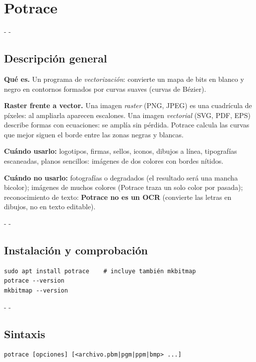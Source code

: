 \documentclass[11pt,a4paper]{article}
\makeatletter
\newcommand{\necesitaespacio}[1]{\par\penalty-100\begingroup
	\setlength{\dimen@}{#1}\dimen@ii\pagegoal\advance\dimen@ii-\pagetotal
	\ifdim\dimen@>\dimen@ii\ifdim\dimen@ii>\z@\vfil\fi\penalty-\@M\fi\endgroup}
\makeatother
\begin{document}
	\section{Potrace}\label{sec:potrace}
	
	\necesitaespacio{8\baselineskip}
	\subsection{Descripción general}
	
	\textbf{Qué es.} Un programa de \emph{vectorización}: convierte un mapa de bits en blanco y negro en contornos formados por curvas suaves (curvas de Bézier).
	
	\textbf{Raster frente a vector.} Una imagen \emph{raster} (PNG, JPEG) es una cuadrícula de píxeles: al ampliarla aparecen escalones. Una imagen \emph{vectorial} (SVG, PDF, EPS) describe formas con ecuaciones: se amplía sin pérdida. Potrace calcula las curvas que mejor siguen el borde entre las zonas negras y blancas.
	
	\textbf{Cuándo usarlo:} logotipos, firmas, sellos, iconos, dibujos a línea, tipografías escaneadas, planos sencillos: imágenes de dos colores con bordes nítidos.
	
	\textbf{Cuándo no usarlo:} fotografías o degradados (el resultado será una mancha bicolor); imágenes de muchos colores (Potrace traza un solo color por pasada); reconocimiento de texto: \textbf{Potrace no es un OCR} (convierte las letras en dibujos, no en texto editable).
	
	\necesitaespacio{8\baselineskip}
	\subsection{Instalación y comprobación}
	
	\begin{lstlisting}
sudo apt install potrace    # incluye también mkbitmap
potrace --version
mkbitmap --version
\end{lstlisting}
	
	\necesitaespacio{8\baselineskip}
	\subsection{Sintaxis}
	
	\begin{lstlisting}[style=sintaxis]
potrace [opciones] [<archivo.pbm|pgm|ppm|bmp> ...]
\end{lstlisting}
	
\end{document}
